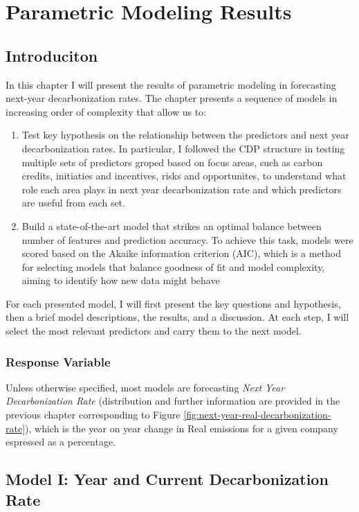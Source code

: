 \chapter{Parametric Modeling Results}

\section{Introduciton}
In this chapter I will present the results of parametric modeling in forecasting next-year decarbonization rates. The chapter presents a sequence of models in increasing order of complexity that allow us to:
\begin{enumerate}
    \item Test key hypothesis on the relationship between the predictors and next year decarbonization rates. In particular, I followed the CDP structure in testing multiple sets of predictors groped based on focus areas, such as carbon credits, initiaties and incentives, risks and opportunites, to understand what role each area plays in next year decarbonization rate and which predictors are useful from each set. 
    \item Build a state-of-the-art model that strikes an optimal balance between number of features and prediction accuracy. To achieve this task, models were scored based on the Akaike information criterion (AIC), which is a method for selecting models that balance goodness of fit and model complexity, aiming to identify how new data might behave \cite{AIC}
\end{enumerate}
For each presented model, I will first present the key questions and hypothesis, then a brief model descriptions, the results, and a discussion. At each step, I will select the most relevant predictors and carry them to the next model. 

\subsection{Response Variable}
\noindent Unless otherwise specified, most models are forecasting \textit{Next Year Decarbonization Rate} (distribution and further information are provided in the previous chapter corresponding to Figure \ref{fig:next-year-real-decarbonization-rate}), which is the year on year change in Real emissions for a given company espressed as a percentage. 

\section{Model I: Year and Current Decarbonization Rate}

